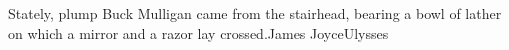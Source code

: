 \documentclass{article}
\begin{document}
    \begin{sentencediagram}{2}{1.75}{Stately, plump Buck Mulligan came from the stairhead, bearing a bowl of lather on which a mirror and a razor lay crossed.}{James Joyce}{Ulysses}
    \end{sentencediagram}
\end{document}
